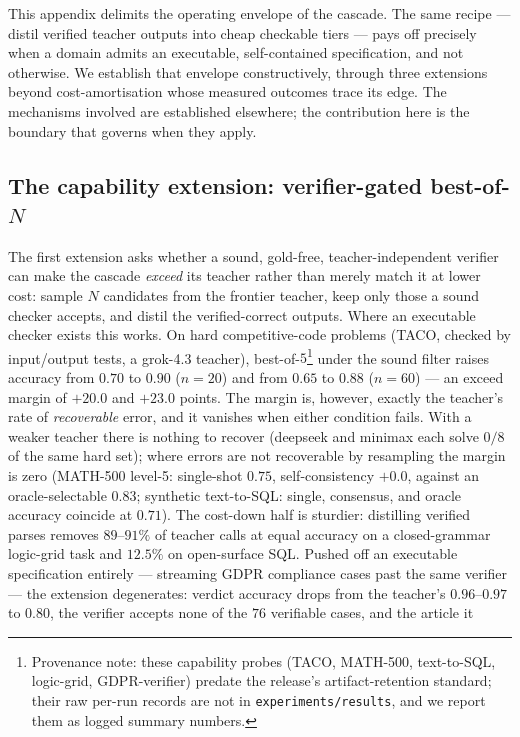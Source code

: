 \documentclass[11pt]{article}
\theoremstyle{plain}
\begin{document}
This appendix delimits the operating envelope of the cascade. The same
recipe --- distil verified teacher outputs into cheap checkable tiers ---
pays off precisely when a domain admits an executable, self-contained
specification, and not otherwise. We establish that envelope
constructively, through three extensions beyond cost-amortisation whose
measured outcomes trace its edge. The mechanisms involved are established
elsewhere; the contribution here is the boundary that governs when they
apply.

\subsection{The capability extension: verifier-gated best-of-\texorpdfstring{$N$}{N}}
The first extension asks whether a sound, gold-free, teacher-independent
verifier can make the cascade \emph{exceed} its teacher rather than merely
match it at lower cost: sample $N$ candidates from the frontier teacher,
keep only those a sound checker accepts, and distil the verified-correct
outputs. Where an executable checker exists this works. On hard
competitive-code problems (TACO, checked by input/output tests, a
grok-4.3 teacher), best-of-$5$\footnote{Provenance note: these capability
probes (TACO, MATH-500, text-to-SQL, logic-grid, GDPR-verifier) predate the
release's artifact-retention standard; their raw per-run records are not in
\texttt{experiments/results}, and we report them as logged summary numbers.} under the sound filter raises accuracy from
$0.70$ to $0.90$ ($n{=}20$) and from $0.65$ to $0.88$ ($n{=}60$) --- an
exceed margin of $+20.0$ and $+23.0$ points. The margin is, however,
exactly the teacher's rate of \emph{recoverable} error, and it vanishes
when either condition fails. With a weaker teacher there is nothing to
recover (deepseek and minimax each solve $0/8$ of the same hard set);
where errors are not recoverable by resampling the margin is zero
(MATH-500 level-5: single-shot $0.75$, self-consistency $+0.0$, against an
oracle-selectable $0.83$; synthetic text-to-SQL: single, consensus, and
oracle accuracy coincide at $0.71$). The cost-down half is sturdier:
distilling verified parses removes $89$--$91\%$ of teacher calls at equal
accuracy on a closed-grammar logic-grid task and $12.5\%$ on open-surface
SQL. Pushed off an executable specification entirely --- streaming GDPR
compliance cases past the same verifier --- the extension degenerates:
verdict accuracy drops from the teacher's $0.96$--$0.97$ to $0.80$, the
verifier accepts none of the $76$ verifiable cases, and the article it
\end{document}
